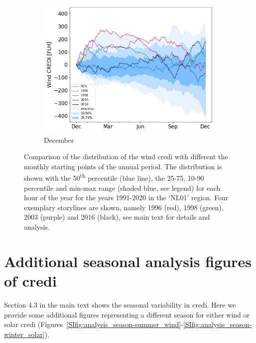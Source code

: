 \documentclass[a4paper,11pt]{extarticle}
\newcommand{\ts}[1]{\textsuperscript{#1}}
\newcommand{\credi}[0]{{\sc credi}}
\newcommand{\sdi}[0]{{\sc solar credi}}
\newcommand{\wdi}[0]{{\sc wind credi}}
\begin{document}
\begin{figure}[b]
\begin{subfigure}[t]{0.32\linewidth}
    \includegraphics[width=\linewidth]{Fig_CUMSUM_YearStart_December}
    \caption{December }
\end{subfigure}
\caption{
    Comparison of the distribution of the \wdi{} with different the monthly starting points of the annual period. 
    The distribution is shown with the 50\ts{th} percentile (blue line), the 25-75, 10-90 percentile and min-max range (shaded blue, see legend) for each hour of the year for the years 1991-2020 in the `NL01' region. 
    Four exemplary storylines are shown, namely 1996 (red), 1998 (green), 2003 (purple) and 2016 (black), see main text for details and analysis.}
\label{SIfig:startdate_wind}
\end{figure}





\clearpage
\section{Additional seasonal analysis figures of \credi}\label{app:seasonal}
Section 4.3 in the main text shows the seasonal variability in \credi.
Here we provide some additional figures representing a different season for either {\sc wind} or \sdi{} (Figures~\ref{SIfig:analysis_season-summer_wind}-\ref{SIfig:analysis_season-winter_solar}). 
\end{document}
